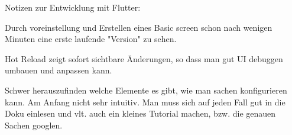 Notizen zur Entwicklung mit Flutter:


Durch voreinstellung und Erstellen eines Basic screen schon nach wenigen Minuten eine erste laufende "Version" zu sehen.

Hot Reload zeigt sofort sichtbare Änderungen, so dass man gut UI debuggen umbauen und anpassen kann.

Schwer herauszufinden welche Elemente es gibt, wie man sachen konfigurieren kann. Am Anfang nicht sehr intuitiv. Man muss sich auf jeden Fall gut in die Doku einlesen und vlt. auch ein kleines Tutorial machen, bzw. die genauen Sachen googlen.